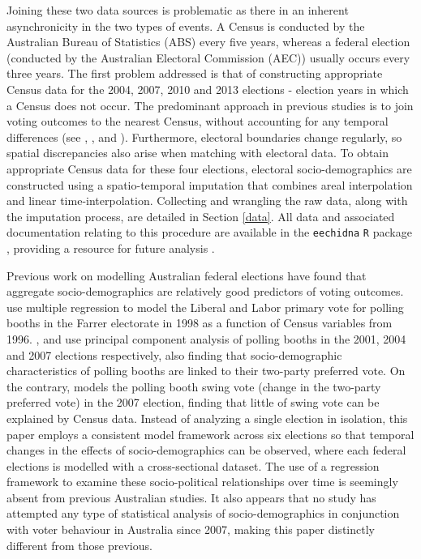 \documentclass[11pt,a4paper,]{article}
\begin{document}
Joining these two data sources is problematic as there in an inherent asynchronicity in the two types of events. A Census is conducted by the Australian Bureau of Statistics (ABS) every five years, whereas a federal election (conducted by the Australian Electoral Commission (AEC)) usually occurs every three years. The first problem addressed is that of constructing appropriate Census data for the 2004, 2007, 2010 and 2013 elections - election years in which a Census does not occur. The predominant approach in previous studies is to join voting outcomes to the nearest Census, without accounting for any temporal differences (see \textcite{DavisStimson98}, \textcite{Stimson06}, \textcite{Liao09} and \textcite{Stimson09}). Furthermore, electoral boundaries change regularly, so spatial discrepancies also arise when matching with electoral data. To obtain appropriate Census data for these four elections, electoral socio-demographics are constructed using a spatio-temporal imputation that combines areal interpolation \autocite{Goodchild1993} and linear time-interpolation. Collecting and wrangling the raw data, along with the imputation process, are detailed in Section \ref{data}. All data and associated documentation relating to this procedure are available in the \texttt{eechidna} \texttt{R} package \autocite{eechidna}, providing a resource for future analysis .

Previous work on modelling Australian federal elections have found that aggregate socio-demographics are relatively good predictors of voting outcomes. \textcite{Forrest01} use multiple regression to model the Liberal and Labor primary vote for polling booths in the Farrer electorate in 1998 as a function of Census variables from 1996. \textcite{Stimson06}, \textcite{Stimson09} and \textcite{Stimson12} use principal component analysis of polling booths in the 2001, 2004 and 2007 elections respectively, also finding that socio-demographic characteristics of polling booths are linked to their two-party preferred vote. On the contrary, \textcite{Stimson09} models the polling booth swing vote (change in the two-party preferred vote) in the 2007 election, finding that little of swing vote can be explained by Census data. Instead of analyzing a single election in isolation, this paper employs a consistent model framework across six elections so that temporal changes in the effects of socio-demographics can be observed, where each federal elections is modelled with a cross-sectional dataset. The use of a regression framework to examine these socio-political relationships over time is seemingly absent from previous Australian studies. It also appears that no study has attempted any type of statistical analysis of socio-demographics in conjunction with voter behaviour in Australia since 2007, making this paper distinctly different from those previous.
\end{document}
